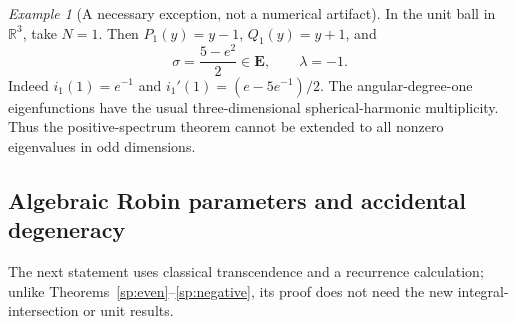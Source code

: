 \documentclass[11pt]{article}
\theoremstyle{definition}
\theoremstyle{remark}
\newtheorem{example}[theorem]{Example}
\begin{document}
\begin{example}[A necessary exception, not a numerical artifact]
In the unit ball in $\mathbb R^3$, take $N=1$.  Then
$P_1(y)=y-1$, $Q_1(y)=y+1$, and
\[
 \boxed{\quad \sigma=\frac{5-e^2}{2}\in\mathbf E,\qquad
                   \lambda=-1.\quad}
\]
Indeed $i_1(1)=e^{-1}$ and
$i_1'(1)=(e-5e^{-1})/2$.  The angular-degree-one eigenfunctions have
the usual three-dimensional spherical-harmonic multiplicity.
Thus the positive-spectrum theorem cannot be extended to all nonzero
eigenvalues in odd dimensions.
\end{example}

\subsection{Algebraic Robin parameters and accidental degeneracy}

The next statement uses classical transcendence and a recurrence
calculation; unlike Theorems~\ref{sp:even}--\ref{sp:negative}, its proof
does not need the new integral-intersection or unit results.
\end{document}
